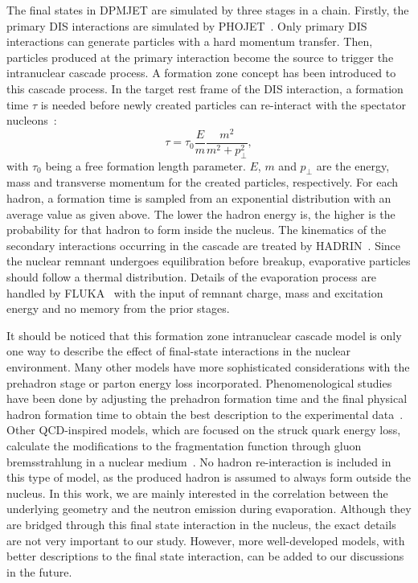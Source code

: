The final states in DPMJET are simulated by three stages in a chain. Firstly,
the primary DIS interactions are simulated by PHOJET~\cite{Engel:1995yda}. Only
primary DIS interactions can generate particles with a hard momentum transfer.
Then, particles produced at the primary interaction become the source to trigger the
intranuclear cascade process. A formation zone concept has been introduced to
this cascade process. In the target rest frame of the DIS interaction, a
formation time $\tau$ is needed before newly created particles can re-interact
with the spectator nucleons~\cite{Ferrari:1995cq}:
\begin{equation}
\tau = \tau_{0}\frac{E}{m}\frac{m^{2}}{m^{2}+p^{2}_{\perp}},
\end{equation}
with $\tau_{0}$ being a free formation length parameter. $E$, $m$ and
$p_{\perp}$ are the energy, mass and transverse momentum for the created
particles, respectively. For each hadron, a formation time is sampled from an
exponential distribution with an average value as given above. The lower the
hadron energy is, the higher is the probability for that hadron to form inside
the nucleus. The kinematics of the secondary interactions occurring in the
cascade are treated by HADRIN~\cite{Hanssgen:1986az}. Since the nuclear remnant
undergoes equilibration before breakup, evaporative particles should follow a
thermal distribution. Details of the evaporation process are handled by
FLUKA~\cite{Ferrari:2005zk} with the input of remnant charge, mass and
excitation energy and no memory from the prior stages.

It should be noticed that this formation zone intranuclear cascade model is only
one way to describe the effect of final-state interactions in the nuclear
environment. Many other models have more sophisticated considerations with the
prehadron stage or parton energy loss incorporated. Phenomenological studies
have been done by adjusting the prehadron formation time and the final physical
hadron formation time to obtain the best description to the experimental
data~\cite{Akopov:2004ap}. Other QCD-inspired models, which are focused on the
struck quark energy loss, calculate the modifications to the fragmentation
function through gluon bremsstrahlung in a nuclear
medium~\cite{Salgado:2003gb,Chang:2014fba}. No hadron re-interaction is included
in this type of model, as the produced hadron is assumed to always form outside
the nucleus. In this work, we are mainly interested in the correlation between
the underlying geometry and the neutron emission during evaporation. Although
they are bridged through this final state interaction in the nucleus, the exact
details are not very important to our study. However, more well-developed
models, with better descriptions to the final state interaction, can be added to
our discussions in the future.


